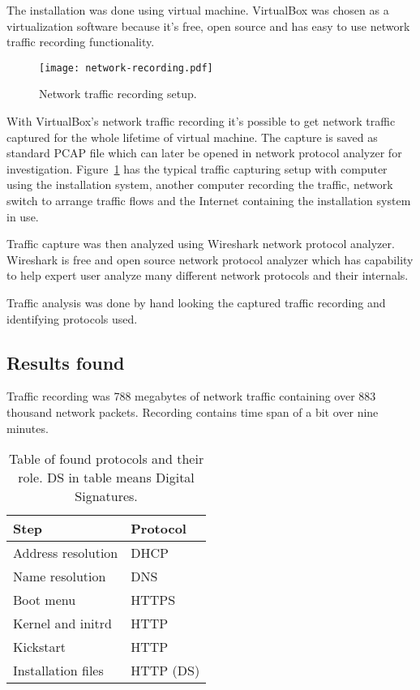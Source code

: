 The installation was done using virtual machine. VirtualBox was chosen
as a virtualization software because it's free, open source and has
easy to use network traffic recording functionality.

\begin{figure}[h]
  \texttt{[image: network-recording.pdf]}
  \caption{Network traffic recording setup.\label{fig:network-recording}}
\end{figure}

With VirtualBox's network traffic recording it's possible to get
network traffic captured for the whole lifetime of virtual
machine. The capture is saved as standard PCAP file which can later be
opened in network protocol analyzer for
investigation. Figure~\ref{fig:network-recording} has the typical
traffic capturing setup with computer using the installation
system, another computer recording the traffic, network switch
to arrange traffic flows and the Internet containing the installation
system in use.

Traffic capture was then analyzed using Wireshark network protocol
analyzer. Wireshark is free and open source network protocol analyzer
which has capability to help expert user analyze many different
network protocols and their internals.

Traffic analysis was done by hand looking the captured traffic
recording and identifying protocols used.

\subsection{Results found}

Traffic recording was 788 megabytes of network traffic containing over
883 thousand network packets. Recording contains time span of a bit
over nine minutes.

\begin{table}[!ht]
  \def\arraystretch{1.1}%
  \begin{center}
    \begin{tabular}{| l | l |}
      \hline
      Step               & Protocol    \\
      \hline
      Address resolution & DHCP        \\
      Name resolution    & DNS         \\
      Boot menu          & HTTPS       \\
      Kernel and initrd  & HTTP        \\
      Kickstart          & HTTP        \\
      Installation files & HTTP (DS)   \\
      \hline
    \end{tabular}
    \caption{Table of found protocols and their role. DS in table
      means Digital Signatures.\label{tab:found_protocols_table}}
  \end{center}
\end{table}

